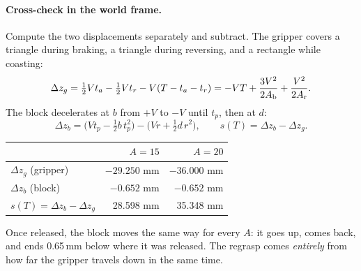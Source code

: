 \paragraph{Cross-check in the world frame.} Compute the two displacements separately and subtract.
The gripper covers a triangle during braking, a triangle during reversing, and a rectangle while coasting:
\[
  \Delta z_g = \tfrac12Vt_a-\tfrac12Vt_r-V(T-t_a-t_r) = -VT+\frac{3V^2}{2A_{\rm b}}+\frac{V^2}{2A_{\rm r}} .
\]
The block decelerates at $b$ from $+V$ to $-V$ until $t_p$, then at $d$:
\[
  \Delta z_b = \big(Vt_p-\tfrac12 b\,t_p^2\big)-\big(Vr+\tfrac12 d\,r^2\big),\qquad s(T)=\Delta z_b-\Delta z_g .
\]
\begin{center}
\small
\begin{tabular}{lrr}
\toprule
 & $A=15$ & $A=20$\\
\midrule
$\Delta z_g$ (gripper) & $-29.250$ mm & $-36.000$ mm\\
$\Delta z_b$ (block) & $-0.652$ mm & $-0.652$ mm\\
$s(T)=\Delta z_b-\Delta z_g$ & 28.598 mm & 35.348 mm\\
\bottomrule
\end{tabular}
\end{center}
Once released, the block moves the same way for every $A$: it goes up, comes back, and ends 0.65\,mm below where it
was released. The regrasp comes \emph{entirely} from how far the gripper travels down in the same time.

